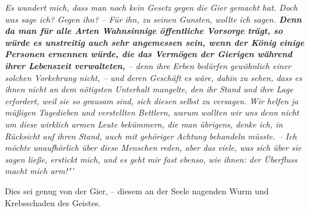 \medskip

\textit{Es wundert mich, dass man noch kein Gesetz gegen die
Gier gemacht hat. Doch was
sage ich? Gegen ihn? – Für ihn, zu seinen Gunsten, wollte ich sagen.
\label{ref:13_22_wahnsinnige}\textbf{Denn da man
für alle Arten Wahnsinnige öffentliche Vorsorge trägt, so würde es unstreitig
auch sehr angemessen sein, wenn der König einige Personen ernennen würde, die das
Vermögen der Gierigen während ihrer Lebenszeit verwalteten,} -- denn ihre Erben
bedürfen gewöhnlich einer solchen Vorkehrung nicht, -- und deren Geschäft es
wäre, dahin zu sehen, dass es ihnen nicht an dem nötigsten Unterhalt mangelte,
den ihr Stand und ihre Lage erfordert, weil sie so grausam sind, sich diesen
selbst zu versagen. Wir helfen ja müßigen Tagedieben und verstellten
Bettlern,
warum wollten wir uns denn nicht um diese wirklich armen Leute bekümmern, die
man übrigens, denke ich, in Rücksicht auf ihren Stand, auch mit gehöriger
Achtung behandeln müsste. -- Ich möchte unaufhörlich über diese Menschen reden,
aber das viele, was sich über sie sagen ließe, erstickt mich, und es geht mir
fast ebenso, wie ihnen: der Überfluss macht mich arm!"'}

\medskip

Dies sei genug von der Gier, -- diesem an der Seele nagenden Wurm und
Krebsschaden des Geistes.




